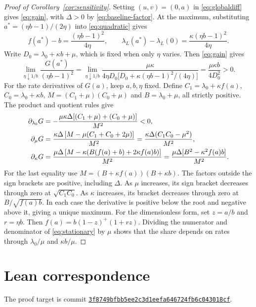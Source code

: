\documentclass[11pt]{article}
\theoremstyle{definition}
\newcommand{\lam}{\lambda_L}
\newcommand{\peak}{a^*}
\begin{document}
\begin{proof}[Proof of Corollary~\ref{cor:sensitivity}]
Setting $(u,v)=(0,a)$ in \eqref{eq:globaldiff} gives \eqref{eq:gain},
with $\Delta>0$ by \eqref{eq:baseline-factor}. At the maximum,
substituting $\peak=(\eta b-1)/(2\eta)$ into \eqref{eq:quadratic} gives
\begin{equation}\label{eq:peak-gain}
 f(\peak)-b=\frac{(\eta b-1)^2}{4\eta},\qquad
 \lam(\peak)-\lam(0)=\frac{\kappa(\eta b-1)^2}{4\eta}.
\end{equation}
Write $D_0=\lambda_0+\kappa b+\mu$, which is fixed when only $\eta$
varies. Then \eqref{eq:gain} gives
\begin{equation}\label{eq:peak-gain-limit}
 \lim_{\eta\downarrow 1/b}
  \frac{G(\peak)}{(\eta b-1)^2}
 =\lim_{\eta\downarrow 1/b}
  \frac{\mu\kappa}{4\eta D_0\big[D_0+\kappa(\eta b-1)^2/(4\eta)\big]}
 =\frac{\mu\kappa b}{4D_0^2}>0 .
\end{equation}
For the rate derivatives of $G(a)$, keep $a,b,\eta$ fixed. Define
$C_1=\lambda_0+\kappa f(a)$, $C_0=\lambda_0+\kappa b$,
$M=(C_1+\mu)(C_0+\mu)$ and $B=\lambda_0+\mu$, all strictly positive.
The product and quotient rules give
\begin{align}
 \partial_{\lambda_0}G
 &=-\frac{\mu\kappa\Delta[(C_1+\mu)+(C_0+\mu)]}{M^2}<0,\notag\\
 \partial_\mu G
 &=\frac{\kappa\Delta\,[M-\mu(C_1+C_0+2\mu)]}{M^2}
  =\frac{\kappa\Delta(C_1C_0-\mu^2)}{M^2},\label{eq:gain-derivatives}\\
 \partial_\kappa G
 &=\frac{\mu\Delta\,[M-\kappa(B(f(a)+b)+2\kappa f(a)b)]}{M^2}
  =\frac{\mu\Delta[B^2-\kappa^2 f(a)b]}{M^2}.\notag
\end{align}
For the last equality use $M=(B+\kappa f(a))(B+\kappa b)$.
The factors outside the sign brackets are positive, including
$\Delta$. As $\mu$ increases, its sign bracket decreases through
zero at $\sqrt{C_1C_0}$. As $\kappa$ increases, its bracket decreases
through zero at $B/\sqrt{f(a)b}$. In each case the derivative is positive
below the root and negative above it, giving a unique maximum.
For the dimensionless form, set $z=a/b$ and $r=\eta b$.
Then $f(a)=b(1-z)^+(1+rz)$. Dividing the numerator and denominator
of \eqref{eq:stationary} by $\mu$ shows that the share depends on rates
through $\lambda_0/\mu$ and $\kappa b/\mu$.
\end{proof}
\clearpage
\section{Lean correspondence}\label{app:lean}
The proof target is commit
\href{https://github.com/wbgradost/ai-project/blob/3f8749bfbb5ee2c3d1eefa646724fb6c043018cf/paper/paper.pdf}
{\texttt{3f8749bfbb5ee2c3d1eefa646724fb6c043018cf}}.
\end{document}
